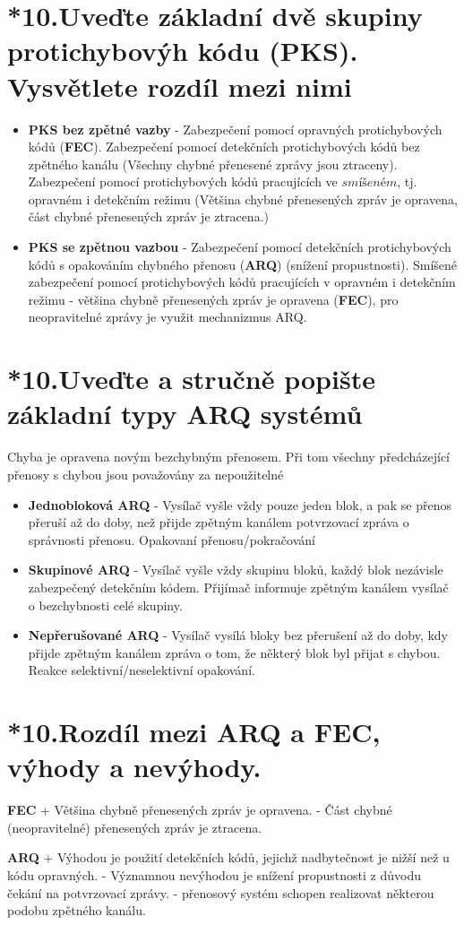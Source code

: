 \section{*10.Uveďte základní dvě skupiny protichybovýh kódu (PKS). Vysvětlete rozdíl mezi nimi}
\begin{itemize}
    \item \textbf{PKS bez zpětné vazby} - Zabezpečení pomocí opravných protichybových kódů (\textbf{FEC}). Zabezpečení pomocí detekčních protichybových kódů bez zpětného kanálu (Všechny chybné přenesené zprávy jsou ztraceny). Zabezpečení pomocí protichybových kódů pracujících ve $smíšeném$, tj. opravném i detekčním režimu (Většina chybné přenesených zpráv je opravena, část chybné přenesených zpráv je ztracena.)
    \item \textbf{PKS se zpětnou vazbou} - Zabezpečení pomocí detekčních  protichybových kódů s opakováním chybného přenosu (\textbf{ARQ}) (snížení propustnosti). Smíšené zabezpečení pomocí protichybových kódů pracujících v opravném i detekčním režimu - většina chybně přenesených zpráv je opravena (\textbf{FEC}), pro neopravitelné zprávy je využit mechanizmus ARQ.
\end{itemize}

\section{*10.Uveďte a stručně popište základní typy ARQ systémů}
Chyba je opravena novým bezchybným přenosem. Při tom všechny předcházející přenosy s chybou jsou považovány za nepoužitelné
\begin{itemize}
    \item \textbf{Jednobloková ARQ} - Vysílač vyšle vždy pouze jeden blok, a pak se přenos přeruší až do doby, než přijde zpětným kanálem potvrzovací zpráva o správnosti přenosu. Opakovaní přenosu/pokračování
    \item \textbf{Skupinové ARQ} - Vysílač vyšle vždy skupinu bloků, každý blok nezávisle zabezpečený detekčním kódem. Přijímač informuje zpětným kanálem vysílač o bezchybnosti celé skupiny.
    \item \textbf{Nepřerušované ARQ} - Vysílač vysílá bloky bez přerušení až do doby, kdy přijde zpětným kanálem zpráva o tom, že některý blok byl přijat s chybou. Reakce selektivní/neselektivní opakování.
\end{itemize}
\section{*10.Rozdíl mezi ARQ a FEC, výhody a nevýhody.}
\textbf{FEC} + Většina chybně přenesených zpráv je opravena. - Část chybné (neopravitelné) přenesených zpráv je ztracena. 

\textbf{ARQ} + Výhodou je použití detekčních kódů, jejichž nadbytečnost je nižší než u kódu opravných. - Významnou nevýhodou je snížení propustnosti z důvodu čekání na potvrzovací zprávy. - přenosový systém schopen realizovat některou podobu zpětného kanálu.
